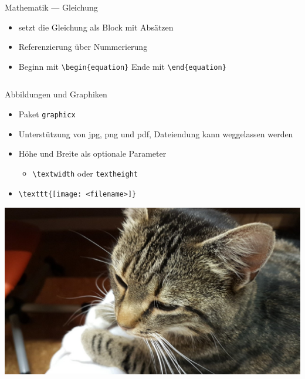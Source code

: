 \documentclass[presentation,aspectratio=169]{beamer}
\begin{document}
\begin{frame}[fragile]{Mathematik --- Gleichung}
  \begin{itemize}
    \item setzt die Gleichung als Block mit Absätzen
    \item Referenzierung über Nummerierung
    \item Beginn mit \verb|\begin{equation}| Ende mit \verb|\end{equation}|
  \end{itemize}
  
  \begin{minipage}{.4\textwidth}
    
  \end{minipage}
  \hfill
  \begin{minipage}{.5\textwidth}
    \inputminted{latex}{codebeispiele/math-equation.tex}
  \end{minipage}
\end{frame}

\begin{frame}[fragile]{Abbildungen und Graphiken}
  \begin{itemize}
    \item Paket \verb|graphicx|
    \item Unterstützung von jpg, png und pdf, Dateiendung kann weggelassen werden
    \item Höhe und Breite als optionale Parameter
      \begin{itemize}
        \item \verb|\textwidth| oder \verb|textheight|
      \end{itemize}
    \item
      \begin{verbatim}
\texttt{[image: <filename>]}
      \end{verbatim}
  \end{itemize}
  \begin{center}
    \includegraphics[height=.5\textheight]{katze}
  \end{center}
\end{frame}
\end{document}
